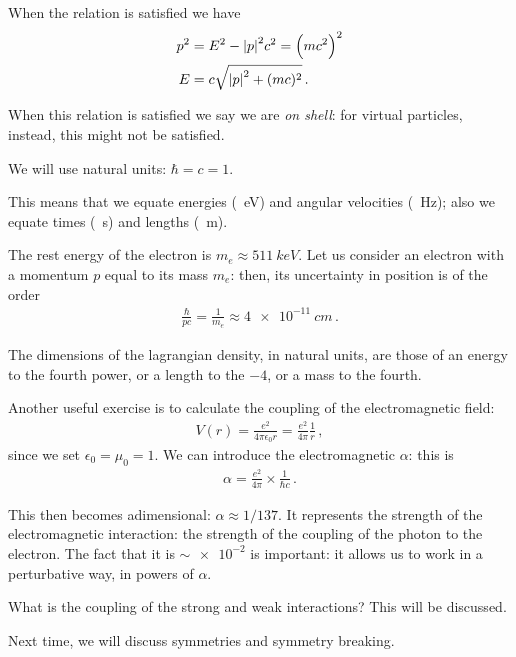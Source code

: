 \documentclass[main.tex]{subfiles}
\begin{document}
When the relation is satisfied we have 
%
\begin{align}
p^2 &= E^2 - \abs{p}^2 c^2= \qty(mc^2)^2  \\
E &= c \sqrt{\abs{p}^2 + (mc)^2}
\,.
\end{align}


When this relation is satisfied we say we are \emph{on shell}: for virtual particles, instead, this might not be satisfied.

We will use natural units: \(\hbar = c = 1\). 

This means that we equate energies (\SI{}{eV}) and angular velocities (\SI{}{Hz}); also we equate times (\SI{}{s}) and lengths (\SI{}{m}). 

The rest energy of the electron is \(m_e \approx \SI{511}{keV}\).
Let us consider an electron with a momentum \(p\) equal to its mass \(m_e\): then, its uncertainty in position is of the order 
%
\begin{align}
\frac{\hbar}{p c} = \frac{1}{m_e} \approx \SI{4e-11}{cm}
\,.
\end{align}

The dimensions of the lagrangian density, in natural units, are those of an energy to the fourth power, or a length to the \(-4\), or a mass to the fourth. 

Another useful exercise is to calculate the coupling of the electromagnetic field: 
%
\begin{align}
V(r) = \frac{e^2}{4 \pi \epsilon_{0} r} = \frac{e^2}{4 \pi } \frac{1}{r} 
\,,
\end{align}
%
since we set \(\epsilon_{0} = \mu_0 = 1\). 
We can introduce the electromagnetic \(\alpha \): this is 
%
\begin{align}
\alpha = \frac{e^2}{4 \pi } \times \frac{1}{\hbar c} 
\,.
\end{align}

This then becomes adimensional: \(\alpha \approx 1 / 137\). 
It represents the strength of the electromagnetic interaction: the strength of the coupling of the photon to the electron.  
The fact that it is \(\sim \num{e-2}\) is important: it allows us to work in a perturbative way, in powers of \(\alpha \). 

What is the coupling of the strong and weak interactions? This will be discussed.

Next time, we will discuss symmetries and symmetry breaking. 
\end{document}
